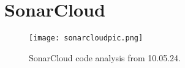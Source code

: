 \section{SonarCloud}
\label{appendix:sonarcloud}
\begin{figure}[H]
    \begin{center}
        \texttt{[image: sonarcloudpic.png]}
    \end{center}
    \caption{SonarCloud code analysis from 10.05.24.}
    \label{fig:sonarcloud-dashboard}
\end{figure}

